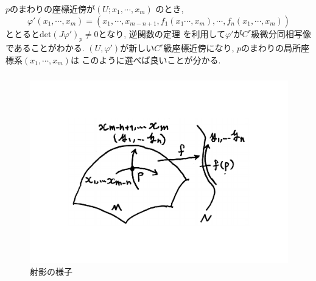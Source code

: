 \documentclass[dvipdfmx,cjk]{beamer}
\theoremstyle{definition}
\begin{document}
\begin{frame}
  $p$のまわりの座標近傍が$(U;x_1, \cdots ,x_m)$
  のとき, 
  $$\varphi '(x_1,\cdots ,x_m)=
  (x_1,\cdots ,x_{m-n+1},f_1(x_1\cdots ,x_m),\cdots
  ,f_n(x_1,\cdots ,x_m))$$
  ととるとdet$(J\varphi ')_p\neq 0$となり, 逆関数の定理
  を利用して$\varphi '$が$C^r$級微分同相写像であることがわかる. 
  $(U,\varphi ')$が新しい$C^r$級座標近傍になり, 
  $p$のまわりの局所座標系$(x_1,\cdots ,x_m)$は
  このように選べば良いことが分かる.
  \frametitle{}
  \begin{figure}[H]
    \centering
    \includegraphics[keepaspectratio, scale=0.35]{projection_new.pdf}
    \caption{射影の様子}
    \label{projectionTheorem}
   \end{figure}
\end{frame}
\end{document}
